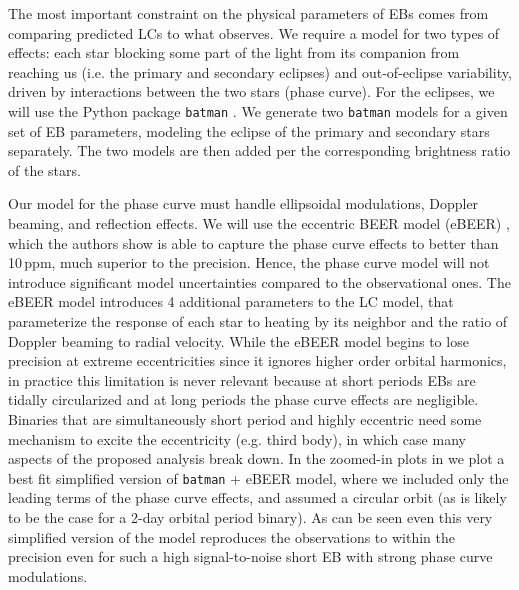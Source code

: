The most important constraint on the physical parameters of EBs comes from
comparing predicted LCs to what \tess{} observes. We require a model for two
types of effects: each star blocking some part of the light from its companion
from reaching us (i.e. the primary and secondary eclipses) and out-of-eclipse
variability, driven by interactions between the two stars (phase curve). For the
eclipses, we will use the Python package \texttt{batman} \citep{Kreidberg_15}.
We generate two \texttt{batman} models for a given set of EB parameters,
modeling the eclipse of the primary and secondary stars separately. The two
models are then added per the corresponding brightness ratio of the stars.

Our model for the phase curve must handle ellipsoidal modulations, Doppler
beaming, and reflection effects. We will use the eccentric BEER model (eBEER)
\citep{Engel_et_al_20}, which the authors show is able to capture the phase
curve effects to better than 10\,ppm, much superior to the \tess{} precision.
Hence, the phase curve model will not introduce significant model uncertainties
compared to the observational ones. The eBEER model introduces 4 additional
parameters to the LC model, that parameterize the response of each star to
heating by its neighbor and the ratio of Doppler beaming to radial velocity.
While the eBEER model begins to lose precision at extreme eccentricities since
it ignores higher order orbital harmonics, in practice this limitation is never
relevant because at short periods EBs are tidally circularized and at long
periods the phase curve effects are negligible. Binaries that are simultaneously
short period and highly eccentric need some mechanism to excite the eccentricity
(e.g. third body), in which case many aspects of the proposed analysis break
down. In the zoomed-in plots in  we plot a best fit
simplified version of \texttt{batman} + eBEER model, where we included only the
leading terms of the phase curve effects, and assumed a circular orbit (as is
likely to be the case for a 2-day orbital period binary). As can be seen even
this very simplified version of the model reproduces the observations to within
the \tess{} precision even for such a high signal-to-noise short EB with strong
phase curve modulations.


